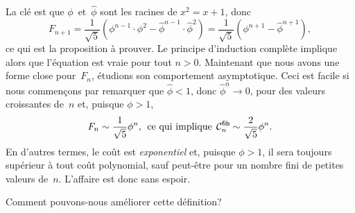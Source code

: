 La clé est que \(\phi\)~et~\(\hat\phi\) sont les racines de \(x^2 = x
+ 1\), donc
\begin{equation*}
  F_{n+1} = \frac{1}{\sqrt{5}}(\phi^{n-1} \cdot \phi^2 -
          \hat\phi^{n-1} \cdot \hat\phi^2)
       = \frac{1}{\sqrt{5}}(\phi^{n+1} - \hat\phi^{n+1}),
\end{equation*}
ce qui est la proposition à prouver. Le principe d'induction complète
implique alors que l'équation est vraie pour tout \(n>0\).
 Maintenant que nous avons une forme close
pour~\(F_n\), étudions son comportement asymptotique. Ceci est facile
si nous commençons par remarquer que \(\hat\phi < 1\), donc
\(\hat\phi^n \rightarrow 0\), pour des valeurs croissantes de~\(n\)
et, puisque \(\phi > 1\),
\begin{equation*}
F_n \sim \frac{1}{\sqrt{5}}\phi^n,\,\; \text{ce qui implique}
\,\; \C{\fun{fib}}{n} \sim \frac{2}{\sqrt{5}}\phi^n.
\end{equation*}
En d'autres termes, le coût est \emph{exponentiel}
et, puisque \(\phi > 1\), il sera toujours supérieur à tout coût
polynomial, sauf peut-être pour un nombre fini de petites valeurs
de~\(n\). L'affaire est donc sans espoir.

Comment pouvons-nous améliorer cette définition?


